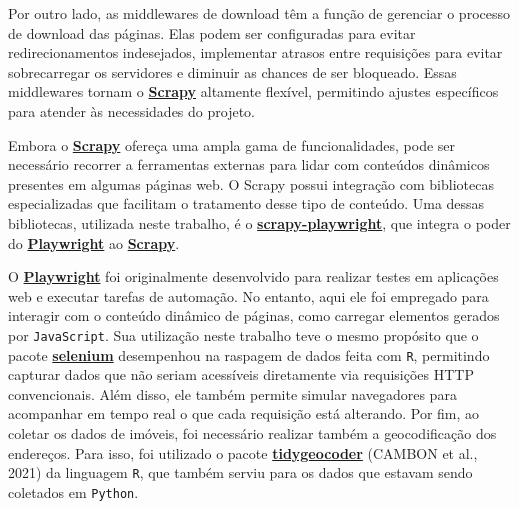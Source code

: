 \documentclass[
  12pt,
  a4paper,
]{scrreprt}
\begin{document}
\vspace{12pt}

Por outro lado, as middlewares de download têm a função de gerenciar o
processo de download das páginas. Elas podem ser configuradas para
evitar redirecionamentos indesejados, implementar atrasos entre
requisições para evitar sobrecarregar os servidores e diminuir as
chances de ser bloqueado. Essas middlewares tornam o
\href{https://docs.scrapy.org/en/latest}{\textbf{Scrapy}} altamente
flexível, permitindo ajustes específicos para atender às necessidades do
projeto.

\vspace{12pt}

Embora o \href{https://docs.scrapy.org/en/latest}{\textbf{Scrapy}}
ofereça uma ampla gama de funcionalidades, pode ser necessário recorrer
a ferramentas externas para lidar com conteúdos dinâmicos presentes em
algumas páginas web. O Scrapy possui integração com bibliotecas
especializadas que facilitam o tratamento desse tipo de conteúdo. Uma
dessas bibliotecas, utilizada neste trabalho, é o
\href{https://github.com/scrapy-plugins/scrapy-playwright}{\textbf{scrapy-playwright}},
que integra o poder do
\href{https://playwright.dev/python/}{\textbf{Playwright}} ao
\href{https://docs.scrapy.org/en/latest}{\textbf{Scrapy}}.

\vspace{12pt}

O \href{https://playwright.dev/python/}{\textbf{Playwright}} foi
originalmente desenvolvido para realizar testes em aplicações web e
executar tarefas de automação. No entanto, aqui ele foi empregado para
interagir com o conteúdo dinâmico de páginas, como carregar elementos
gerados por \texttt{JavaScript}. Sua utilização neste trabalho teve o
mesmo propósito que o pacote
\href{https://cran.r-project.org/web/packages/selenium/index.html}{\textbf{selenium}}
desempenhou na raspagem de dados feita com \texttt{R}, permitindo
capturar dados que não seriam acessíveis diretamente via requisições
HTTP convencionais. Além disso, ele também permite simular navegadores
para acompanhar em tempo real o que cada requisição está alterando. Por
fim, ao coletar os dados de imóveis, foi necessário realizar também a
geocodificação dos endereços. Para isso, foi utilizado o pacote
\href{https://jessecambon.github.io/tidygeocoder/}{\textbf{tidygeocoder}}
(CAMBON et al., 2021) da linguagem \texttt{R}, que também serviu para os
dados que estavam sendo coletados em \texttt{Python}.

\vspace{12pt}
\end{document}
